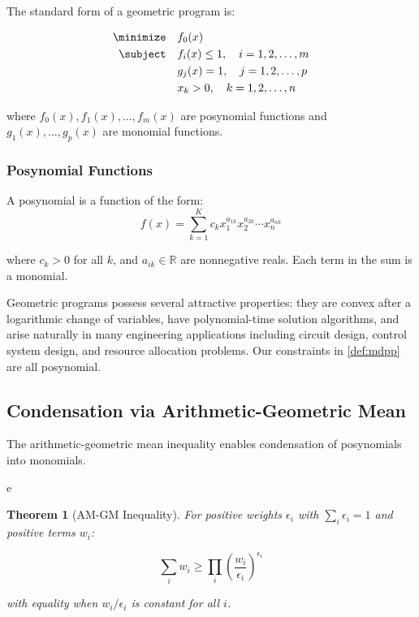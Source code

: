 \documentclass[11pt]{article}
\newtheorem{theorem}{Theorem}
\begin{document}
The standard form of a geometric program is:

\begin{align}
\minimize \quad & f_0(x) \\
\subject \quad & f_i(x) \leq 1, \quad i = 1, 2, \ldots, m \\
& g_j(x) = 1, \quad j = 1, 2, \ldots, p \\
& x_k > 0, \quad k = 1, 2, \ldots, n
\end{align}

where $f_0(x), f_1(x), \ldots, f_m(x)$ are posynomial functions and
$g_1(x), \ldots, g_p(x)$ are monomial functions.

\subsubsection{Posynomial Functions}

A posynomial is a function of the form:
\begin{equation}
f(x) = \sum_{k=1}^{K} c_k x_1^{a_{1k}} x_2^{a_{2k}} \cdots x_n^{a_{nk}}
\end{equation}

where $c_k > 0$ for all $k$, and $a_{ik} \in \mathbb{R}$ are nonnegative
reals. Each term in the sum is a monomial.

Geometric programs possess several attractive properties: they are
convex after a logarithmic change of variables, have polynomial-time
solution algorithms, and arise naturally in many engineering
applications including circuit design, control system design, and
resource allocation problems. Our constraints in \autoref{def:mdpp}
are all posynomial.

\subsection{Condensation via Arithmetic-Geometric Mean}

The arithmetic-geometric mean inequality enables condensation of
posynomials into monomials.

e\begin{theorem}[AM-GM Inequality]

  For positive weights $\epsilon_i$ with $\sum_i \epsilon_i = 1$ and
  positive terms $w_i$:

\begin{equation}
    \sum_{i} w_i \geq \prod_{i} \left(\frac{w_i}{\epsilon_i}\right)^{\epsilon_i}
\end{equation}

with equality when $w_i/\epsilon_i$ is constant for all $i$.
\end{theorem}
\end{document}

